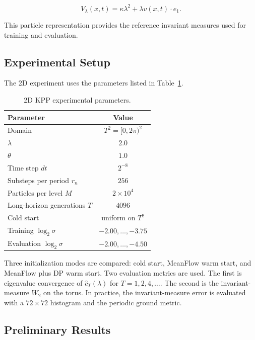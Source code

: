 \documentclass[11pt]{article}
\begin{document}
\begin{equation}
V_\lambda(x,t)=\kappa\lambda^2+\lambda v(x,t)\cdot e_1.
\end{equation}

This particle representation provides the reference invariant measures used
for training and evaluation.

\subsection{Experimental Setup}

The 2D experiment uses the parameters listed in Table~\ref{tab:2d_setup}.

\begin{table}[htbp]
\centering
\caption{2D KPP experimental parameters.}
\label{tab:2d_setup}
\begin{tabular}{lc}
\toprule
Parameter & Value \\
\midrule
Domain & \(T^2=[0,2\pi)^2\) \\
\(\lambda\) & \(2.0\) \\
\(\theta\) & \(1.0\) \\
Time step \(dt\) & \(2^{-8}\) \\
Substeps per period \(r_n\) & \(256\) \\
Particles per level \(M\) & \(2\times 10^4\) \\
Long-horizon generations \(T\) & \(4096\) \\
Cold start & uniform on \(T^2\) \\
Training \(\log_2\sigma\) & \(-2.00,\ldots,-3.75\) \\
Evaluation \(\log_2\sigma\) & \(-2.00,\ldots,-4.50\) \\
\bottomrule
\end{tabular}
\end{table}

Three initialization modes are compared: cold start, MeanFlow warm start, and
MeanFlow plus DP warm start. Two evaluation metrics are used. The first is
eigenvalue convergence of \(\hat c_T(\lambda)\) for
\(T=1,2,4,\ldots\). The second is the invariant-measure \(W_2\) on the torus.
In practice, the invariant-measure error is evaluated with a \(72\times 72\)
histogram and the periodic ground metric.

\subsection{Preliminary Results}
\end{document}
